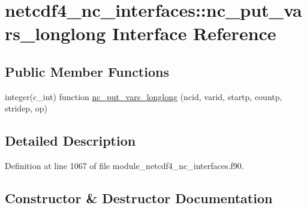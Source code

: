 \hypertarget{interfacenetcdf4__nc__interfaces_1_1nc__put__vars__longlong}{}\section{netcdf4\+\_\+nc\+\_\+interfaces\+:\+:nc\+\_\+put\+\_\+vars\+\_\+longlong Interface Reference}
\label{interfacenetcdf4__nc__interfaces_1_1nc__put__vars__longlong}
\subsection*{Public Member Functions}
\begin{DoxyCompactItemize}
\item 
integer(c\+\_\+int) function \hyperlink{interfacenetcdf4__nc__interfaces_1_1nc__put__vars__longlong_ab54db75ddd75ef364ab7f8bef8a3ef9d}{nc\+\_\+put\+\_\+vars\+\_\+longlong} (ncid, varid, startp, countp, stridep, op)
\end{DoxyCompactItemize}


\subsection{Detailed Description}


Definition at line 1067 of file module\+\_\+netcdf4\+\_\+nc\+\_\+interfaces.\+f90.



\subsection{Constructor \& Destructor Documentation}
\mbox{\label{interfacenetcdf4__nc__interfaces_1_1nc__put__vars__longlong_ab54db75ddd75ef364ab7f8bef8a3ef9d}} 
